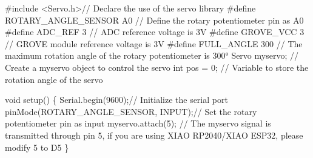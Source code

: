 \documentclass[
  letterpaper,
  DIV=11,
  numbers=noendperiod]{scrreprt}
\newenvironment{Shaded}{\begin{snugshade}}{\end{snugshade}}
\newcommand{\CommentTok}[1]{\textcolor[rgb]{0.37,0.37,0.37}{#1}}
\newcommand{\DataTypeTok}[1]{\textcolor[rgb]{0.68,0.00,0.00}{#1}}
\newcommand{\DecValTok}[1]{\textcolor[rgb]{0.68,0.00,0.00}{#1}}
\newcommand{\ImportTok}[1]{\textcolor[rgb]{0.00,0.46,0.62}{#1}}
\newcommand{\NormalTok}[1]{\textcolor[rgb]{0.00,0.23,0.31}{#1}}
\newcommand{\OperatorTok}[1]{\textcolor[rgb]{0.37,0.37,0.37}{#1}}
\newcommand{\PreprocessorTok}[1]{\textcolor[rgb]{0.68,0.00,0.00}{#1}}
\begin{document}
\begin{Shaded}
\begin{Highlighting}[]
\PreprocessorTok{\#include }\ImportTok{\textless{}Servo.h\textgreater{}}\CommentTok{// Declare the use of the servo library}
\PreprocessorTok{\#define ROTARY\_ANGLE\_SENSOR }\NormalTok{A0}\PreprocessorTok{ }\CommentTok{// Define the rotary potentiometer pin as A0}
\PreprocessorTok{\#define ADC\_REF }\DecValTok{3}\PreprocessorTok{ }\CommentTok{// ADC reference voltage is 3V}
\PreprocessorTok{\#define GROVE\_VCC }\DecValTok{3}\PreprocessorTok{ }\CommentTok{// GROVE module reference voltage is 3V}
\PreprocessorTok{\#define FULL\_ANGLE }\DecValTok{300}\PreprocessorTok{ }\CommentTok{// The maximum rotation angle of the rotary potentiometer is 300°}
\NormalTok{Servo myservo}\OperatorTok{;}  \CommentTok{// Create a myservo object to control the servo}
\DataTypeTok{int}\NormalTok{ pos }\OperatorTok{=} \DecValTok{0}\OperatorTok{;} \CommentTok{// Variable to store the rotation angle of the servo}

\DataTypeTok{void}\NormalTok{ setup}\OperatorTok{()} \OperatorTok{\{}
\NormalTok{    Serial}\OperatorTok{.}\NormalTok{begin}\OperatorTok{(}\DecValTok{9600}\OperatorTok{);}\CommentTok{// Initialize the serial port}
\NormalTok{    pinMode}\OperatorTok{(}\NormalTok{ROTARY\_ANGLE\_SENSOR}\OperatorTok{,}\NormalTok{ INPUT}\OperatorTok{);}\CommentTok{// Set the rotary potentiometer pin as input}
\NormalTok{    myservo}\OperatorTok{.}\NormalTok{attach}\OperatorTok{(}\DecValTok{5}\OperatorTok{);}  \CommentTok{// The myservo signal is transmitted through pin 5, if you are using XIAO RP2040/XIAO ESP32, please modify 5 to D5}
\OperatorTok{\}}


\end{Highlighting}
\end{Shaded}
\end{document}
